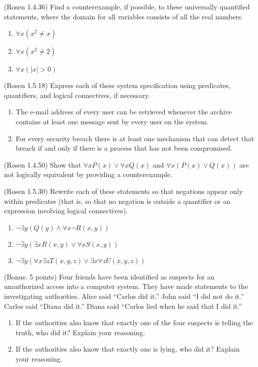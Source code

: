 \documentclass[10pt]{exam}
\begin{document}
\begin{questions}
\question[6] (Rosen 1.4.36) Find a counterexample, if possible, to these universally quantified 
statements, where the domain for all variables consists of all the real numbers.
\begin{enumerate} [label=(\alph*)]
  \item $\forall x (x^2\neq x)$
  \item $\forall x (x^2 \neq 2)$
  \item $\forall x (|x| > 0)$
\end{enumerate}


\question[4] (Rosen 1.5.18) Express each of these system specification using predicates, quantifiers, and logical connectives, if necessary.

\begin{enumerate} [label=(\alph*)]
   \item The e-mail address of every user can be retrieved whenever the archive contains at least one message sent by every user on the system.
   \item For every security breach there is at least one mechanism that can detect that breach if and only if there is a process that has not been compromised.
\end{enumerate}

\question[6] (Rosen 1.4.50) Show that $\forall x P(x) \vee \forall x Q(x)$ and $\forall x (P(x) \vee Q(x))$ are not
logically equivalent by providing a counterexample.



\question[6] (Rosen 1.5.30) Rewrite each of these statements so that negations appear only within predicates (that is, so that no negation is outside a quantifier or an expression involving logical connectives).
\begin{enumerate} [label=(\alph*)]
  \item $\neg \exists y \left(Q(y) \land \forall x \neg R(x,y) \right)$
  \item $\neg \exists y \left(\exists x R(x,y) \lor \forall x S(x,y) \right)$
  \item $\neg \exists y \left(\forall x \exists z T(x,y,z) \lor \exists x \forall z U(x,y,z) \right)$
\end{enumerate}


\question (Bonus: 5 points) Four friends have been identified as suspects for an unauthorized access into a computer system. They have made statements to the investigating authorities. Alice said ``Carlos did it.'' John said ``I did not do it.'' Carlos said ``Diana did it.'' Diana said ``Carlos lied when he said that I did it.''
\begin{enumerate} [label=(\alph*)]
  \item If the authorities also know that exactly one of the four suspects is telling the truth, who did it? Explain your reasoning.
  \item If the authorities also know that exactly one is lying, who did it? Explain your reasoning.
\end{enumerate}

\end{questions}
\end{document}
